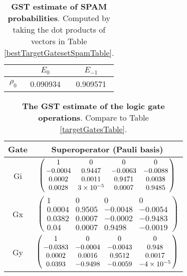 {\begin{table}[h]
\begin{center}
\begin{tabular}[l]{|c|c|c|}
\hline
 & $E_{0}$ & $E_{-1}$ \\ \hline
$\rho_{0}$ & 0.090934 & 0.909571 \\ \hline
\end{tabular}

\caption{\textbf{GST estimate of SPAM probabilities}.  Computed by taking the dot products of vectors in Table \ref{bestTargetGatesetSpamTable}.\label{bestTargetGatesetSpamParametersTable}}
\end{center}
\end{table}

\begin{table}[h]
\begin{center}
\begin{tabular}[l]{|c|c|}
\hline
Gate & Superoperator (Pauli basis) \\ \hline
Gi & $ \left(\!\!\begin{array}{cccc}
1 & 0 & 0 & 0 \\ 
-0.0004 & 0.9447 & -0.0063 & -0.0088 \\ 
0.0002 & 0.0011 & 0.9471 & 0.0038 \\ 
0.0028 & 3\times 10^{-5} & 0.0007 & 0.9485
 \end{array}\!\!\right) $
 \\ \hline
Gx & $ \left(\!\!\begin{array}{cccc}
1 & 0 & 0 & 0 \\ 
0.0004 & 0.9505 & -0.0048 & -0.0054 \\ 
0.0382 & 0.0007 & -0.0002 & -0.9483 \\ 
0.04 & 0.0007 & 0.9498 & -0.0019
 \end{array}\!\!\right) $
 \\ \hline
Gy & $ \left(\!\!\begin{array}{cccc}
1 & 0 & 0 & 0 \\ 
-0.0383 & -0.0004 & -0.0043 & 0.948 \\ 
0.0002 & 0.0016 & 0.9512 & 0.0017 \\ 
0.0393 & -0.9498 & -0.0059 & -4\times 10^{-5}
 \end{array}\!\!\right) $
 \\ \hline
\end{tabular}

\caption{\textbf{The GST estimate of the logic gate operations}.  Compare to Table \ref{targetGatesTable}.\label{bestTargetGatesetGatesTable}}
\end{center}
\end{table}

}

